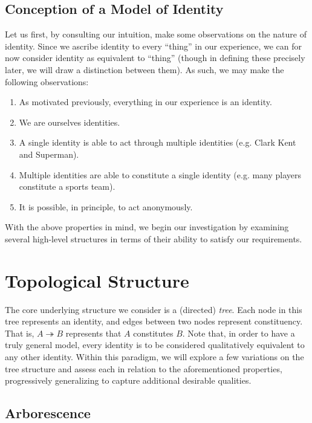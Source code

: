 \documentclass[pra,twocolumn,groupedaddress,10pt]{revtex4}
\theoremstyle{definition}
\begin{document}
\subsection{Conception of a Model of Identity} \label{sec:conmodide}

Let us first, by consulting our intuition, make some observations on the nature of identity. Since we ascribe identity to every ``thing'' in our experience, we can for now consider identity as equivalent to ``thing'' (though in defining these precisely later, we will draw a distinction between them). As such, we may make the following observations:

\begin{enumerate}
	\item As motivated previously, everything in our experience is an identity.
	\item We are ourselves identities.
	\item A single identity is able to act through multiple identities (e.g. Clark Kent and Superman).
	\item Multiple identities are able to constitute a single identity (e.g. many players constitute a sports team).
	\item It is possible, in principle, to act anonymously.
\end{enumerate}

With the above properties in mind, we begin our investigation by examining several high-level structures in terms of their ability to satisfy our requirements.

\section{Topological Structure} \label{sec:topstr}

The core underlying structure we consider is a (directed) \textit{tree}. Each node in this tree represents an identity, and edges between two nodes represent constituency. That is, $A \twoheadrightarrow B$ represents that $A$ constitutes $B$. Note that, in order to have a truly general model, every identity is to be considered qualitatively equivalent to any other identity. Within this paradigm, we will explore a few variations on the tree structure and assess each in relation to the aforementioned properties, progressively generalizing to capture additional desirable qualities.

\subsection{Arborescence} \label{sec:arborescence}
\end{document}

